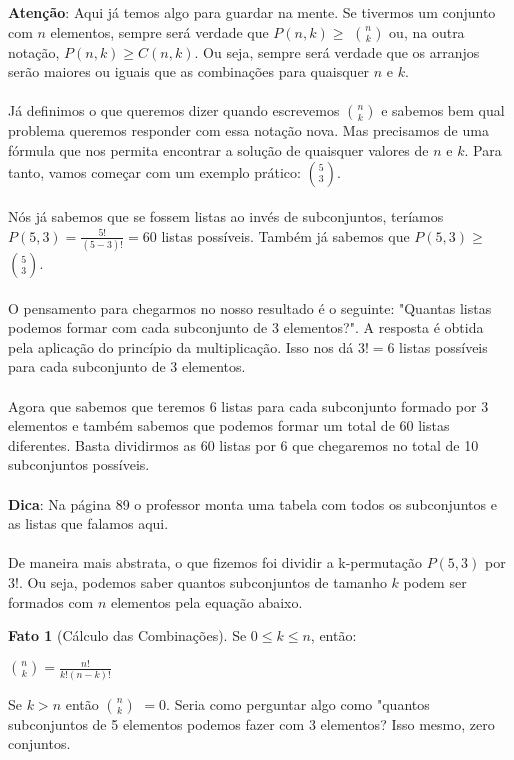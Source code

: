 \documentclass[a4paper,11pt,oneside]{book}
\theoremstyle{definition}
\theoremstyle{break}
\newtheorem{fact}{Fato}[section]
\begin{document}
\textbf{Atenção}: Aqui já temos algo para guardar na mente. Se tivermos um conjunto com $n$ elementos, sempre será verdade que $P(n,k) \geqslant $ $n \choose k$ ou, na outra notação, $P(n,k) \geqslant C(n,k)$. Ou seja, sempre será verdade que os arranjos serão maiores ou iguais que as combinações para quaisquer $n$ e $k$.
\\
\\
Já definimos o que queremos dizer quando escrevemos $n \choose k$ e sabemos bem qual problema queremos responder com essa notação nova. Mas precisamos de uma fórmula que nos permita encontrar a solução de quaisquer valores de $n$ e $k$. Para tanto, vamos começar com um exemplo prático: $5 \choose 3$.
\\
\\
Nós já sabemos que se fossem listas ao invés de subconjuntos, teríamos $P(5,3) = \frac{5!}{(5 - 3)!} = 60$ listas possíveis. Também já sabemos que $P(5,3) \geqslant $ $5 \choose 3$.
\\
\\
O pensamento para chegarmos no nosso resultado é o seguinte: "Quantas listas podemos formar com cada subconjunto de 3 elementos?". A resposta é obtida pela aplicação do princípio da multiplicação. Isso nos dá $3! = 6$ listas possíveis para cada subconjunto de 3 elementos.
\\
\\
Agora que sabemos que teremos 6 listas para cada subconjunto formado por 3 elementos e também sabemos que podemos formar um total de 60 listas diferentes. Basta dividirmos as 60 listas por 6 que chegaremos no total de 10 subconjuntos possíveis.
\\
\\
\textbf{Dica}: Na página 89 o professor monta uma tabela com todos os subconjuntos e as listas que falamos aqui.
\\
\\
De maneira mais abstrata, o que fizemos foi dividir a k-permutação $P(5,3)$ por $3!$. Ou seja, podemos saber quantos subconjuntos de tamanho $k$ podem ser formados com $n$ elementos pela equação abaixo.

\begin{fact}[Cálculo das Combinações]
Se $0 \leq k \leq n$, então:
\begin{center}
 \Large ${n \choose k} = \frac{n!}{k!(n-k)!}$
\end{center}
\end{fact}

Se $k > n$ então $n \choose k$ $= 0$. Seria como perguntar algo como "quantos subconjuntos de 5 elementos podemos fazer com 3 elementos? Isso mesmo, zero conjuntos.
\end{document}
